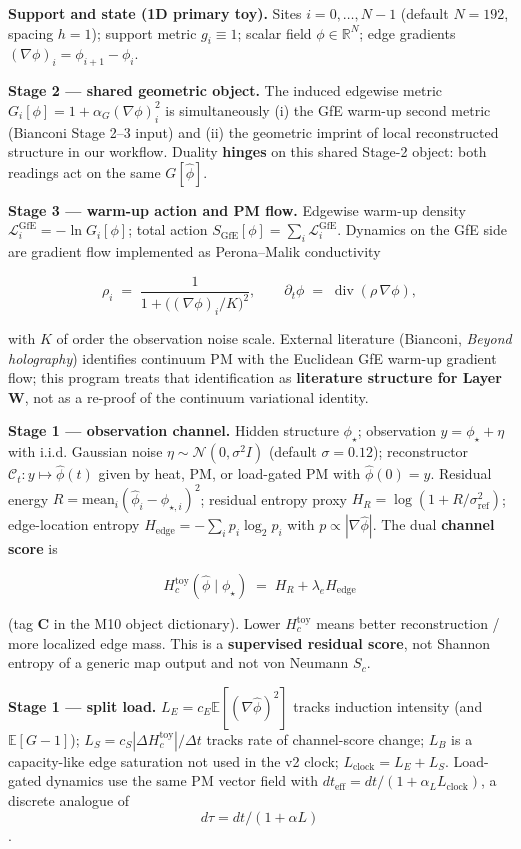 \documentclass[
  11pt,
]{article}
\begin{document}
\textbf{Support and state (1D primary toy).} Sites \(i=0,\ldots,N-1\)
(default \(N=192\), spacing \(h=1\)); support metric \(g_i\equiv 1\);
scalar field \(\phi\in\mathbb{R}^N\); edge gradients
\((\nabla\phi)_i=\phi_{i+1}-\phi_i\).

\textbf{Stage 2 --- shared geometric object.} The induced edgewise
metric \(G_i[\phi]=1+\alpha_G(\nabla\phi)_i^2\) is simultaneously (i)
the GfE warm-up second metric (Bianconi Stage 2--3 input) and (ii) the
geometric imprint of local reconstructed structure in our workflow.
Duality \textbf{hinges} on this shared Stage-2 object: both readings act
on the same \(G[\hat\phi]\).

\textbf{Stage 3 --- warm-up action and PM flow.} Edgewise warm-up
density \(\mathcal{L}_i^{\mathrm{GfE}}=-\ln G_i[\phi]\); total action
\(S_{\mathrm{GfE}}[\phi]=\sum_i\mathcal{L}_i^{\mathrm{GfE}}\). Dynamics
on the GfE side are gradient flow implemented as Perona--Malik
conductivity

\[
\rho_i \;=\; \frac{1}{1+\bigl((\nabla\phi)_i/K\bigr)^2},\qquad
\partial_t\phi \;=\; \operatorname{div}(\rho\,\nabla\phi),
\]

with \(K\) of order the observation noise scale. External literature
(Bianconi, \emph{Beyond holography}) identifies continuum PM with the
Euclidean GfE warm-up gradient flow; this program treats that
identification as \textbf{literature structure for Layer W}, not as a
re-proof of the continuum variational identity.

\textbf{Stage 1 --- observation channel.} Hidden structure
\(\phi_\star\); observation \(y=\phi_\star+\eta\) with i.i.d. Gaussian
noise \(\eta\sim\mathcal{N}(0,\sigma^2 I)\) (default \(\sigma=0.12\));
reconstructor \(\mathcal{C}_t:y\mapsto\hat\phi(t)\) given by heat, PM,
or load-gated PM with \(\hat\phi(0)=y\). Residual energy
\(R=\mathrm{mean}_i(\hat\phi_i-\phi_{\star,i})^2\); residual entropy
proxy \(H_R=\log(1+R/\sigma_{\mathrm{ref}}^2)\); edge-location entropy
\(H_{\mathrm{edge}}=-\sum_i p_i\log_2 p_i\) with
\(p\propto|\nabla\hat\phi|\). The dual \textbf{channel score} is

\[
H_c^{\mathrm{toy}}(\hat\phi\mid\phi_\star) \;=\; H_R + \lambda_e H_{\mathrm{edge}}
\]

(tag \textbf{C} in the M10 object dictionary). Lower
\(H_c^{\mathrm{toy}}\) means better reconstruction / more localized edge
mass. This is a \textbf{supervised residual score}, not Shannon entropy
of a generic map output and not von Neumann \(S_c\).

\textbf{Stage 1 --- split load.}
\(L_E=c_E\mathbb{E}[(\nabla\hat\phi)^2]\) tracks induction intensity
(and \(\mathbb{E}[G-1]\));
\(L_S=c_S|\Delta H_c^{\mathrm{toy}}|/\Delta t\) tracks rate of
channel-score change; \(L_B\) is a capacity-like edge saturation not
used in the v2 clock; \(L_{\mathrm{clock}}=L_E+L_S\). Load-gated
dynamics use the same PM vector field with
\(dt_{\mathrm{eff}}=dt/(1+\alpha_L L_{\mathrm{clock}})\), a discrete
analogue of \[d\tau=dt/(1+\alpha L)\].
\end{document}
